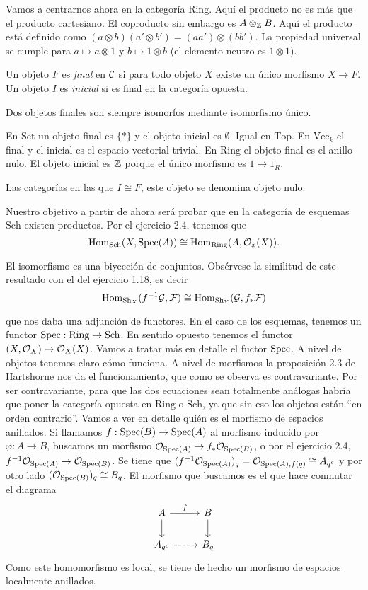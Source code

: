 \documentclass[GA.tex]{subfiles}
\begin{document}
Vamos a centrarnos ahora en la categoría $\mathrm{Ring}$. Aquí el producto no es más que el producto cartesiano. El coproducto sin embargo es $A\otimes_{\mathbb{Z}} B$. Aquí el producto está definido como $(a\otimes b)(a'\otimes b')=(aa')\otimes (bb')$. La propiedad universal se cumple para $a\mapsto a\otimes 1$ y $b\mapsto 1\otimes b$ (el elemento neutro es $1\otimes 1$). 

\begin{defi}
Un objeto $F$ es \emph{final} en $\mathcal{C}$ si para todo objeto $X$ existe un único morfismo $X\to F$. Un objeto $I$ es \emph{inicial} si es final en la categoría opuesta.
\end{defi}
Dos objetos finales son siempre isomorfos mediante isomorfismo único.

\begin{ej}
En $\mathrm{Set}$ un objeto final es $\{*\}$ y el objeto inicial es $\emptyset$. Igual en $\mathrm{Top}$. En $\mathrm{Vec}_k$ el final y el inicial es el espacio vectorial trivial. En $\mathrm{Ring}$ el objeto final es el anillo nulo. El objeto inicial es $\mathbb{Z}$ porque el único morfismo es $1\mapsto 1_R$. 
\end{ej}

Las categorías en las que $I\cong F$, este objeto se denomina objeto nulo. 

Nuestro objetivo a partir de ahora será probar que en la categoría de esquemas $\mathrm{Sch}$ existen productos. Por el ejercicio 2.4, tenemos que
\[
\operatorname{Hom}_{\mathrm{Sch}}(X,\operatorname{Spec}(A))\cong\operatorname{Hom}_{\mathrm{Ring}}(A,{\mathcal O}_x(X)).
\]

El isomorfismo es una biyección de conjuntos. Obsérvese la similitud de este resultado con el del ejercicio 1.18, es decir
\[
\operatorname{Hom}_{\mathrm{Sh}_X}(f^{-1}\mathcal{G},\mathcal{F})\cong \operatorname{Hom}_{\mathrm{Sh}_Y}(\mathcal{G}, f_*\mathcal{F})
\] 

que nos daba una adjunción de functores. En el caso de los esquemas, tenemos un functor $\operatorname{Spec}:\mathrm{Ring}\to \mathrm{Sch}$. En sentido opuesto tenemos el functor $(X,{\mathcal O}_X)\mapsto {\mathcal O}_X(X)$. Vamos a tratar más en detalle el fuctor $\operatorname{Spec}$. A nivel de objetos tenemos claro cómo funciona. A nivel de morfismos la proposición 2.3 de Hartshorne nos da el funcionamiento, que como se observa es contravariante. Por ser contravariante, para que las dos ecuaciones sean totalmente análogas habría que poner la categoría opuesta en $\mathrm{Ring}$ o $\mathrm{Sch}$, ya que sin eso los objetos están ``en orden contrario''. Vamos a ver en detalle quién es el morfismo de espacios anillados. Si llamamos $f:\operatorname{Spec}(B)\to\operatorname{Spec}(A)$ al morfismo inducido por $\varphi:A\to B$, buscamos un morfismo ${\mathcal O}_{\operatorname{Spec}(A)}\to f_*{\mathcal O}_{\operatorname{Spec}(B)}$, o por el ejercicio 2.4, $f^{-1}{\mathcal O}_{\operatorname{Spec}(A)}\to {\mathcal O}_{\operatorname{Spec}(B)}$. Se tiene que $(f^{-1}{\mathcal O}_{\operatorname{Spec}(A)})_q={\mathcal O}_{\operatorname{Spec}(A),f(q)}\cong A_{q^c}$ y por otro lado $({\mathcal O}_{\operatorname{Spec}(B)})_q\cong B_q$. El morfismo que buscamos es el que hace conmutar el diagrama
\[
\begin{tikzcd}
A\arrow[r, "f"]\arrow[d] & B\arrow[d]\\
A_{q^c}\arrow[r, dashed] & B_q
\end{tikzcd}
\]
Como este homomorfismo es local, se tiene de hecho un morfismo de espacios localmente anillados. 
\end{document}
